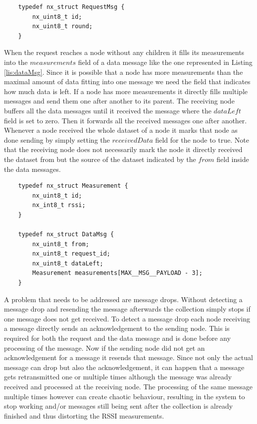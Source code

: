 \begin{lstlisting}
	typedef nx_struct RequestMsg {
		nx_uint8_t id;
		nx_uint8_t round;
	}
\end{lstlisting}

When the request reaches a node without any children it fills its measurements into the $measurements$ field of a data message like the one represented in Listing \ref{lis:dataMsg}.
Since it is possible that a node has more measurements than the maximal amount of data fitting into one message we need the field that indicates how much data is left. If a node has more measurements it directly fills multiple messages and send them one after another to its parent. The receiving node buffers all the data messages until it received the message where the $dataLeft$ field is set to zero. Then it forwards all the received messages one after another. Whenever a node received the whole dataset of a node it marks that node as done sending by simply setting the $receivedData$ field for the node to true. Note that the receiving node does not necessarily mark the node it directly received the dataset from but the source of the dataset indicated by the $from$ field inside the data messages.

\begin{lstlisting}
	typedef nx_struct Measurement {
		nx_uint8_t id;
		nx_int8_t rssi;
	}

	typedef nx_struct DataMsg {
		nx_uint8_t from;
		nx_uint8_t request_id;
		nx_uint8_t dataLeft;
		Measurement measurements[MAX__MSG__PAYLOAD - 3];
	}
\end{lstlisting}

A problem that needs to be addressed are message drops. Without detecting a message drop and resending the message afterwards the collection simply stops if one message does not get received. To detect a message drop each node receiving a message directly sends an acknowledgement to the sending node. This is required for both the request and the data message and is done before any processing of the message. Now if the sending node did not get an acknowledgement for a message it resends that message. Since not only the actual message can drop but also the acknowledgement, it can happen that a message gets retransmitted one or multiple times although the message was already received and processed at the receiving node. The processing of the same message multiple times however can create chaotic behaviour, resulting in the system to stop working and/or messages still being sent after the collection is already finished and thus distorting the RSSI measurements. 

